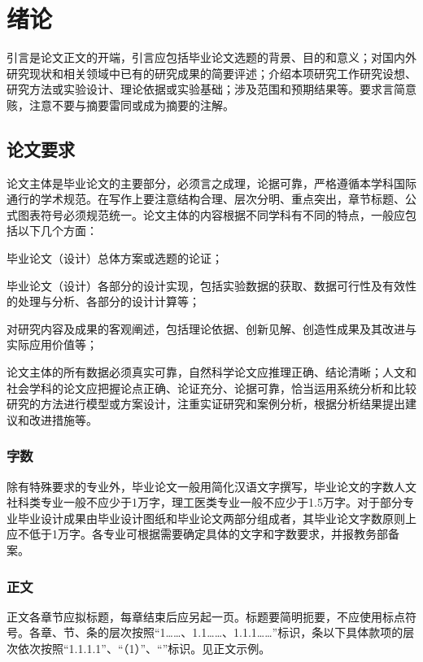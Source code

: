 \documentclass[a4paper,fancyhdr,fntef,UTF8,hyperref,openany,oneside,notitlepage]{book}%
\begin{document}

\chapter{绪论}
引言是论文正文的开端，引言应包括毕业论文选题的背景、目的和意义；对国内外研究现状和相关领域中已有的研究成果的简要评述；介绍本项研究工作研究设想、研究方法或实验设计、理论依据或实验基础；涉及范围和预期结果等。要求言简意赅，注意不要与摘要雷同或成为摘要的注解。

\section{论文要求}
论文主体是毕业论文的主要部分，必须言之成理，论据可靠，严格遵循本学科国际通行的学术规范。在写作上要注意结构合理、层次分明、重点突出，章节标题、公式图表符号必须规范统一。论文主体的内容根据不同学科有不同的特点，一般应包括以下几个方面：
\begin{compactenum}[(1).]
  \item 毕业论文（设计）总体方案或选题的论证；
  \item 毕业论文（设计）各部分的设计实现，包括实验数据的获取、数据可行性及有效性的处理与分析、各部分的设计计算等；
  \item 对研究内容及成果的客观阐述，包括理论依据、创新见解、创造性成果及其改进与实际应用价值等；
  \item 论文主体的所有数据必须真实可靠，自然科学论文应推理正确、结论清晰；人文和社会学科的论文应把握论点正确、论证充分、论据可靠，恰当运用系统分析和比较研究的方法进行模型或方案设计，注重实证研究和案例分析，根据分析结果提出建议和改进措施等。
\end{compactenum}

\subsection{字数}
除有特殊要求的专业外，毕业论文一般用简化汉语文字撰写，毕业论文的字数人文社科类专业一般不应少于1万字，理工医类专业一般不应少于1.5万字。对于部分专业毕业设计成果由毕业设计图纸和毕业论文两部分组成者，其毕业论文字数原则上应不低于1万字。各专业可根据需要确定具体的文字和字数要求，并报教务部备案。

\subsection{正文}
正文各章节应拟标题，每章结束后应另起一页。标题要简明扼要，不应使用标点符号。各章、节、条的层次按照“1……、1.1……、1.1.1……”标识，条以下具体款项的层次依次按照“1.1.1.1”、“（1）”、“”标识。见正文示例。
\end{document}
